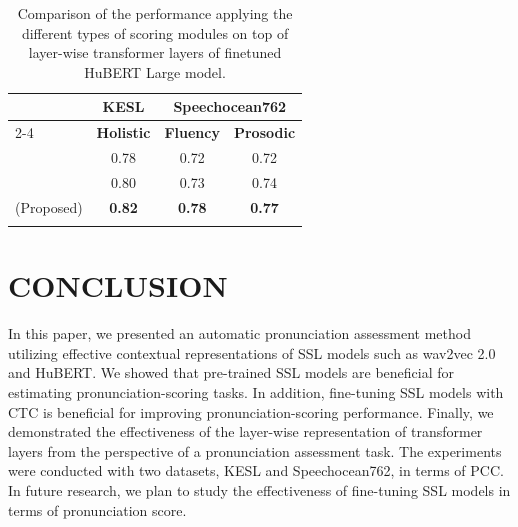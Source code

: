 \documentclass[a4paper]{article}
\begin{document}
\begin{table} [ht]
  \begin{center}
	\begin{tabular}{p{1.8cm}|p{1.0cm}|p{1.0cm}|p{1.0cm}}
	\Xhline{5\arrayrulewidth}
	\multicolumn{1}{c}{{\textbf{\footnotesize Scoring Module}}}&
	\multicolumn{1}{|c}{\textbf{\footnotesize KESL}}&
	\multicolumn{2}{|c}{\textbf{\footnotesize Speechocean762}} \\ \cline{2-4}

	\multicolumn{1}{p{1.8cm}}{ }&
	\multicolumn{1}{|p{1.0cm}}{\centering\textbf{{\footnotesize Holistic}} }&
	\multicolumn{1}{|p{1.0cm}}{\centering\textbf{{\footnotesize Fluency}} }&
	\multicolumn{1}{|p{1.0cm}}{\centering\textbf{{\footnotesize Prosodic}}} \\
	\Xhline{3\arrayrulewidth}

	\multicolumn{1}{c}{\text{LR}} &
	\multicolumn{1}{|c}{0.78} &
	\multicolumn{1}{|c}{0.72} &
	\multicolumn{1}{|c}{0.72} \\
	
	\multicolumn{1}{c}{\text{MLP}} &
	\multicolumn{1}{|c}{0.80} &
	\multicolumn{1}{|c}{0.73} &
	\multicolumn{1}{|c}{0.74} \\

	\multicolumn{1}{c}{\text{BLSTM} (Proposed)} &
	\multicolumn{1}{|c}{\textbf{0.82}} &
	\multicolumn{1}{|c}{\textbf{0.78}} &
	\multicolumn{1}{|c}{\textbf{0.77}} \\


	\Xhline{5\arrayrulewidth}
    \end{tabular}
  \end{center}
  

    \caption{Comparison of the performance applying the different types of scoring modules on top of layer-wise transformer layers of finetuned HuBERT Large model.}
  \label{tab:4}
\end{table}








\section{CONCLUSION}
\label{sec:conclusion}
In this paper, we presented an automatic pronunciation assessment method utilizing effective contextual representations of SSL models such as wav2vec 2.0 and HuBERT. We showed that pre-trained SSL models are beneficial for estimating pronunciation-scoring tasks. In addition, fine-tuning SSL models with CTC is beneficial for improving pronunciation-scoring performance. Finally, we demonstrated the effectiveness of the layer-wise representation of transformer layers from the perspective of a pronunciation assessment task. The experiments were conducted with two datasets, KESL and Speechocean762, in terms of PCC. In future research, we plan to study the effectiveness of fine-tuning SSL models in terms of pronunciation score.









\end{document}
